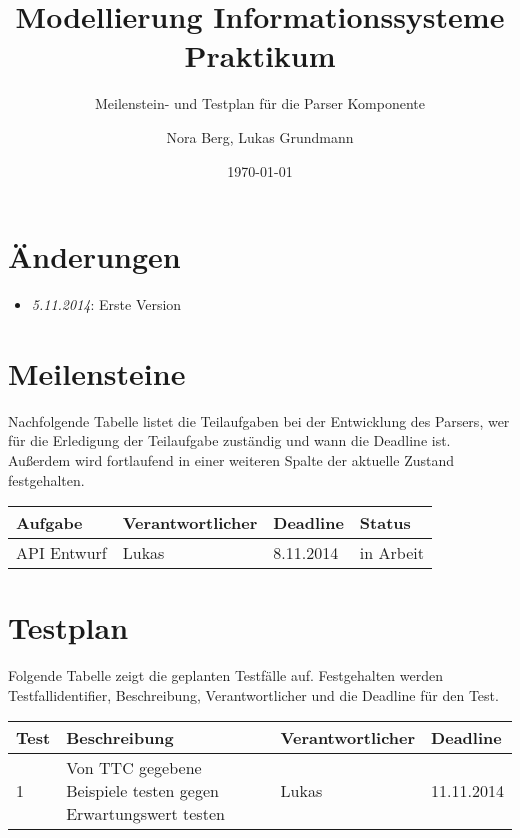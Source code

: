 \documentclass[a4paper,10pt]{scrartcl}
\title{Modellierung Informationssysteme Praktikum}
\subtitle{Meilenstein- und Testplan für die Parser Komponente}
\author{Nora Berg, Lukas Grundmann}
\date{\today}
\begin{document}
\maketitle

\begin{abstract}

\end{abstract}

\section{Änderungen}

\begin{itemize}
 \item \textit{5.11.2014}: Erste Version
\end{itemize}

\section{Meilensteine}

Nachfolgende Tabelle listet die Teilaufgaben bei der Entwicklung des Parsers,
wer für die Erledigung der Teilaufgabe zuständig und wann die Deadline ist.
Außerdem wird fortlaufend in einer weiteren Spalte der aktuelle Zustand festgehalten.

\begin{tabular}{l | l | l | l}
  Aufgabe & Verantwortlicher & Deadline & Status \\ \hline
  API Entwurf & Lukas & 8.11.2014 & in Arbeit
\end{tabular}


\section{Testplan}

Folgende Tabelle zeigt die geplanten Testfälle auf. Festgehalten werden Testfallidentifier,
Beschreibung, Verantwortlicher und die Deadline für den Test.

\begin{tabular}{l | p{8cm} | l | l}
  Test & Beschreibung & Verantwortlicher & Deadline \\ \hline
  1 & Von TTC gegebene Beispiele testen gegen Erwartungswert testen & Lukas & 11.11.2014
\end{tabular}
\end{document}
